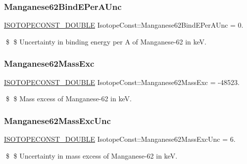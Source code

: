 \subsubsection{\texorpdfstring{Manganese62\+Bind\+E\+Per\+A\+Unc}{Manganese62BindEPerAUnc}}
{\footnotesize\ttfamily \mbox{\hyperlink{group___isotope_const-_macros_ga8f45a7272ce02c0b4c65c44636ed719a}{I\+S\+O\+T\+O\+P\+E\+C\+O\+N\+S\+T\+\_\+\+D\+O\+U\+B\+LE}} Isotope\+Const\+::\+Manganese62\+Bind\+E\+Per\+A\+Unc = 0.}

\$ \$ Uncertainty in binding energy per A of Manganese-\/62 in keV. \mbox{\label{group___isotope_const-_manganese-_mn62_gadd9f73fb200f2b2ec9dbe6ab3be325e0}} 
\subsubsection{\texorpdfstring{Manganese62\+Mass\+Exc}{Manganese62MassExc}}
{\footnotesize\ttfamily \mbox{\hyperlink{group___isotope_const-_macros_ga8f45a7272ce02c0b4c65c44636ed719a}{I\+S\+O\+T\+O\+P\+E\+C\+O\+N\+S\+T\+\_\+\+D\+O\+U\+B\+LE}} Isotope\+Const\+::\+Manganese62\+Mass\+Exc = -\/48523.}

\$ \$ Mass excess of Manganese-\/62 in keV. \mbox{\label{group___isotope_const-_manganese-_mn62_ga1beacc948cee357fdd10d5d00f3a140e}} 
\subsubsection{\texorpdfstring{Manganese62\+Mass\+Exc\+Unc}{Manganese62MassExcUnc}}
{\footnotesize\ttfamily \mbox{\hyperlink{group___isotope_const-_macros_ga8f45a7272ce02c0b4c65c44636ed719a}{I\+S\+O\+T\+O\+P\+E\+C\+O\+N\+S\+T\+\_\+\+D\+O\+U\+B\+LE}} Isotope\+Const\+::\+Manganese62\+Mass\+Exc\+Unc = 6.}

\$ \$ Uncertainty in mass excess of Manganese-\/62 in keV. \mbox{\label{group___isotope_const-_manganese-_mn62_ga1d2365f776e2204d8257b6edc262ae81}} 
